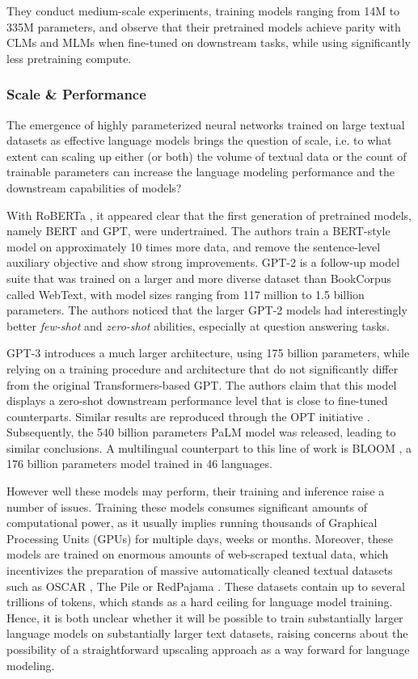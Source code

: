 They conduct medium-scale experiments, training models ranging from 14M to 335M parameters, and observe that their pretrained models achieve parity with CLMs and MLMs when fine-tuned on downstream tasks, while using significantly less pretraining compute.


\subsubsection{Scale \& Performance}
\label{ssec:scaling_law}
The emergence of highly parameterized neural networks trained on large textual datasets as effective language models brings the question of scale, i.e. to what extent can scaling up either (or both) the volume of textual data or the count of trainable parameters can increase the language modeling performance and the downstream capabilities of models?

With RoBERTa \citep{roberta}, it appeared clear that the first generation of pretrained models, namely BERT and GPT, were undertrained. The authors train a BERT-style model on approximately 10 times more data, and remove the sentence-level auxiliary objective and show strong improvements. GPT-2 \citep{gpt2} is a follow-up model suite that was trained on a larger and more diverse dataset than BookCorpus called WebText, with model sizes ranging from 117 million to 1.5 billion parameters. The authors noticed that the larger GPT-2 models had interestingly better \textit{few-shot} and \textit{zero-shot} abilities, especially at question answering tasks.

GPT-3 \citep{gpt3} introduces a much larger architecture, using 175 billion parameters, while relying on a training procedure and architecture that do not significantly differ from the original Transformers-based GPT. The authors claim that this model displays a zero-shot downstream performance level that is close to fine-tuned counterparts. Similar results are reproduced through the OPT initiative \citep{zhang2022opt}. Subsequently, the 540 billion parameters PaLM model \citep{palm} was released, leading to similar conclusions. A multilingual counterpart to this line of work is BLOOM \citep{le2023bloom}, a 176 billion parameters model trained in 46 languages.

However well these models may perform, their training and inference raise a number of issues. Training these models consumes significant amounts of computational power, as it usually implies running thousands of Graphical Processing Units (GPUs) for multiple days, weeks or months. Moreover, these models are trained on enormous amounts of web-scraped textual data, which incentivizes the preparation of massive automatically cleaned textual datasets such as OSCAR \citep{oscar}, The Pile \citep{gao2020pile} or RedPajama \citep{together2023redpajama}. These datasets contain up to several trillions of tokens, which stands as a hard ceiling for language model training. Hence, it is both unclear whether it will be possible to train substantially larger language models on substantially larger text datasets, raising concerns about the possibility of a straightforward upscaling approach as a way forward for language modeling.

